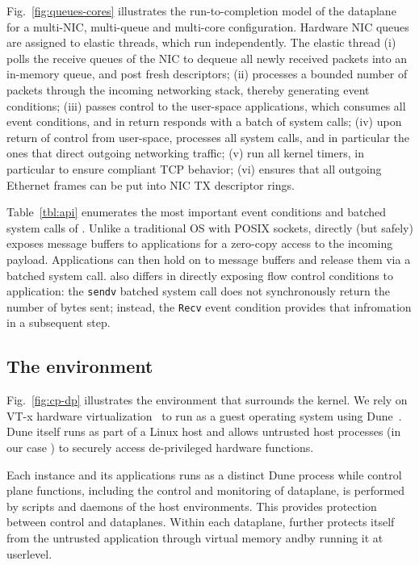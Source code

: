Fig.~\ref{fig:queues-cores} illustrates the run-to-completion model of the
dataplane for a multi-NIC, multi-queue and multi-core configuration.
Hardware NIC queues are assigned to elastic threads, which run
independently.  The elastic thread (i) polls the receive queues of the
NIC to dequeue all newly received packets into an in-memory queue, and
post fresh descriptors; 
 (ii) processes a bounded number of packets
through the incoming networking stack, thereby generating event
conditions; (iii) passes control to the user-space applications, which
consumes all event conditions, and in return responds with a batch of
system calls; (iv) upon return of control from user-space, \ix
processes all system calls, and in particular the ones that direct
outgoing networking traffic; (v) run all kernel timers, in particular
to ensure compliant TCP behavior; (vi) ensures that all outgoing
Ethernet frames can be put into NIC TX descriptor rings.

Table~\ref{tbl:api} enumerates the most important event conditions and
batched system calls of \ix.  Unlike a traditional OS with POSIX
sockets, \ix directly (but safely) exposes message buffers to
applications for a zero-copy access to the incoming payload.
Applications can then hold on to message buffers and release them via
a batched system call.  \ix also differs in directly exposing flow
control conditions to application: the \texttt{sendv} batched system
call does not synchronously return the number of bytes sent; instead,
the \texttt{Recv} event condition provides that infromation in a
subsequent step. 


\subsection{The environment}
\label{sec:impl:env}



Fig.~\ref{fig:cp-dp} illustrates the environment that surrounds the
\ix kernel.  We rely on VT-x hardware
virtualization~\cite{DBLP:journals/computer/UhligNRSMABKLS05} to run
\ix as a guest operating system using Dune~\cite{belay2012dune}. Dune
itself runs as part of a Linux host and allows untrusted host
processes (in our case \ix) to securely access de-privileged hardware
functions.

Each \ix instance and its applications runs as a distinct Dune process
while control plane functions, including the control and monitoring of
dataplane, is performed by scripts and daemons of the host
environments.  This provides protection between control and
dataplanes. Within each dataplane, \ix further protects itself from
the untrusted application through virtual memory andby running it at
userlevel.

